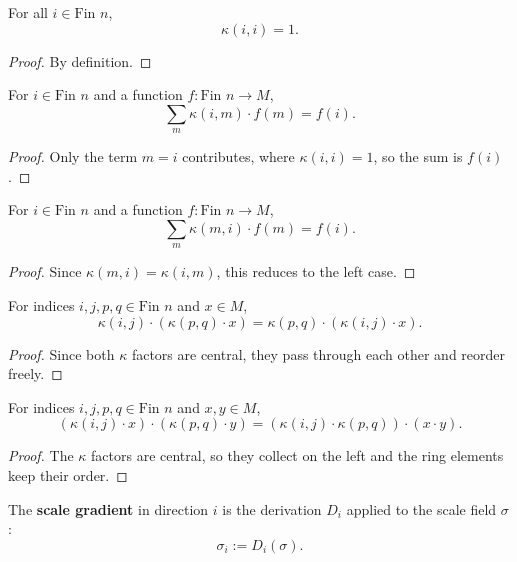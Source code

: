 \begin{theorem}
For all $i \in \text{Fin } n$,
\[
\kappa(i,i) = 1 .
\]
\begin{proof}
By definition.
\end{proof}
\end{theorem}

\begin{theorem}
For $i \in \text{Fin } n$ and a function $f : \text{Fin } n \to M$,
\[
\sum_{m} \kappa(i,m) \cdot f(m) = f(i) .
\]
\begin{proof}
Only the term $m = i$ contributes, where $\kappa(i,i) = 1$, so the sum is $f(i)$.
\end{proof}
\end{theorem}

\begin{theorem}
For $i \in \text{Fin } n$ and a function $f : \text{Fin } n \to M$,
\[
\sum_{m} \kappa(m,i) \cdot f(m) = f(i) .
\]
\begin{proof}
Since $\kappa(m,i) = \kappa(i,m)$, this reduces to the left case.
\end{proof}
\end{theorem}

\begin{theorem}
For indices $i, j, p, q \in \text{Fin } n$ and $x \in M$,
\[
\kappa(i,j) \cdot (\kappa(p,q) \cdot x) = \kappa(p,q) \cdot (\kappa(i,j) \cdot x) .
\]
\begin{proof}
Since both $\kappa$ factors are central, they pass through each other and reorder freely.
\end{proof}
\end{theorem}

\begin{theorem}
For indices $i, j, p, q \in \text{Fin } n$ and $x, y \in M$,
\[
(\kappa(i,j) \cdot x) \cdot (\kappa(p,q) \cdot y) = (\kappa(i,j) \cdot \kappa(p,q)) \cdot (x \cdot y) .
\]
\begin{proof}
The $\kappa$ factors are central, so they collect on the left and the ring elements keep their order.
\end{proof}
\end{theorem}

\begin{definition}
The \textbf{scale gradient} in direction $i$ is the derivation $D_i$ applied to the scale field $\sigma$:
\[
\sigma_i := D_i(\sigma) .
\]
\end{definition}

